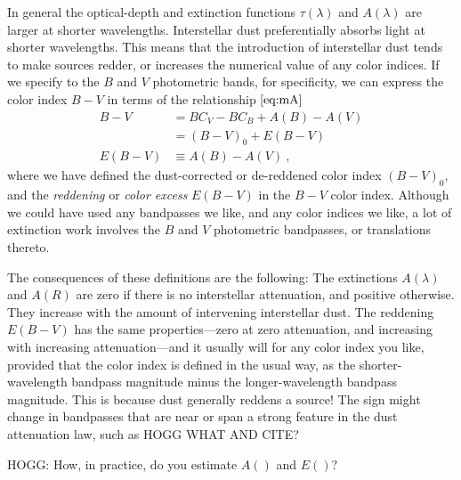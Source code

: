 \documentclass[10pt]{article}
\begin{document}
In general the optical-depth and extinction functions $\tau(\lambda)$ and $A(\lambda)$ are larger at shorter wavelengths.
Interstellar dust preferentially absorbs light at shorter wavelengths.
This means that the introduction of interstellar dust tends to make sources redder, or increases the numerical value of any color indices.
If we specify to the $B$ and $V$ photometric bands, for specificity, we can express the color index $B-V$ in terms of the relationship $\eqref{eq:mA}$
\begin{align}
    B - V &= BC_V - BC_B + A(B) - A(V)\\
          &= (B - V)_0 + E(B - V)\\
    E(B - V) &\equiv A(B) - A(V) ~,
\end{align}
where we have defined the dust-corrected or de-reddened color index $(B-V)_0$,
and the \emph{reddening} or \emph{color excess} $E(B-V)$ in the $B-V$ color index.
Although we could have used any bandpasses we like, and any color indices we like,
a lot of extinction work involves the $B$ and $V$ photometric bandpasses, or translations thereto.

The consequences of these definitions are the following:
The extinctions $A(\lambda)$ and $A(R)$ are zero if there is no interstellar attenuation, and positive otherwise.
They increase with the amount of intervening interstellar dust.
The reddening $E(B-V)$ has the same properties---zero at zero attenuation, and increasing with increasing attenuation---and it usually will for any color index you like, provided that the color index is defined in the usual way, as the shorter-wavelength bandpass magnitude minus the longer-wavelength bandpass magnitude.
This is because dust generally reddens a source!
The sign might change in bandpasses that are near or span a strong feature in the dust attenuation law, such as HOGG WHAT AND CITE?

HOGG: How, in practice, do you estimate $A()$ and $E()$?
\end{document}
